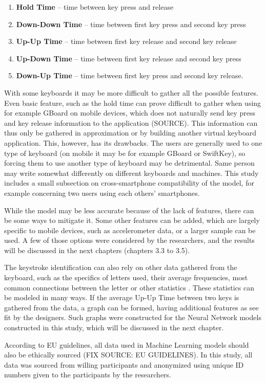 \begin{enumerate}
    \item \textbf{Hold Time} -- time between key press and release
    \item \textbf{Down-Down Time} -- time between first key press and second key press
    \item \textbf{Up-Up Time} -- time between first key release and second key release
    \item \textbf{Up-Down Time} -- time between first key release and second key press
    \item \textbf{Down-Up Time} -- time between first key press and second key release.
\end{enumerate}


With some keyboards it may be more difficult to gather all the possible features. Even basic feature, such as the hold time can prove difficult to gather when using for example GBoard on mobile devices, which does not naturally send key press and key release information to the application (SOURCE). This information can thus only be gathered in approximation or by building another virtual keyboard application. This, however, has its drawbacks. The users are generally used to one type of keyboard (on mobile it may be for example GBoard or SwiftKey), so forcing them to use another type of keyboard may be detrimental. Same person may write somewhat differently on different keyboards and machines. This study includes a small subsection on cross-smartphone compatibility of the model, for example concerning two users using each others' smartphones.

While the model may be less accurate because of the lack of features, there can be some ways to mitigate it. Some other features can be added, which are largely specific to mobile devices, such as accelerometer data, or a larger sample can be used. A few of those options were considered by the researchers, and the results will be discussed in the next chapters (chapters 3.3 to 3.5).

The keystroke identification can also rely on other data gathered from the keyboard, such as the specifics of letters used, their average frequencies, most common connections between the letter or other statistics \cite{Wang2024}. These statistics can be modeled in many ways. If the average Up-Up Time between two keys is gathered from the data, a graph can be formed, having additional features as see fit by the designers. Such graphs were constructed for the Neural Network models constructed in this study, which will be discussed in the next chapter.

According to EU guidelines, all data used in Machine Learning models should also be ethically sourced (FIX SOURCE: EU GUIDELINES). In this study, all data was sourced from willing participants and anonymized using unique ID numbers given to the participants by the researchers.